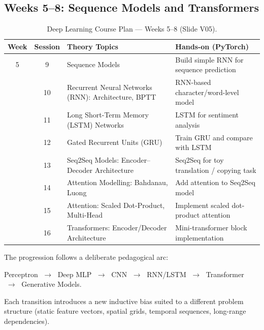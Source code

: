 \documentclass[12pt,a4paper]{article}
\begin{document}
\subsection{Weeks 5--8: Sequence Models and Transformers}
\label{subsec:weeks58}

\begin{table}[ht]
\centering
\caption{Deep Learning Course Plan — Weeks 5--8 (Slide V05).}
\label{tab:weeks58}
\begin{tabularx}{\textwidth}{cclX}
\toprule
\textbf{Week} & \textbf{Session} & \textbf{Theory Topics} & \textbf{Hands-on (PyTorch)} \\
\midrule
5  &  9 & Sequence Models
       & Build simple RNN for sequence prediction \\
\addlinespace
5  & 10 & Recurrent Neural Networks (RNN): Architecture, BPTT
       & RNN-based character/word-level model \\
\addlinespace
6  & 11 & Long Short-Term Memory (LSTM) Networks
       & LSTM for sentiment analysis \\
\addlinespace
6  & 12 & Gated Recurrent Units (GRU)
       & Train GRU and compare with LSTM \\
\addlinespace
7  & 13 & Seq2Seq Models: Encoder--Decoder Architecture
       & Seq2Seq for toy translation / copying task \\
\addlinespace
7  & 14 & Attention Modelling: Bahdanau, Luong
       & Add attention to Seq2Seq model \\
\addlinespace
8  & 15 & Attention: Scaled Dot-Product, Multi-Head
       & Implement scaled dot-product attention \\
\addlinespace
8  & 16 & Transformers: Encoder/Decoder Architecture
       & Mini-transformer block implementation \\
\bottomrule
\end{tabularx}
\end{table}

\begin{keyinsight}
The progression follows a deliberate pedagogical arc:
\begin{center}
Perceptron $\;\longrightarrow\;$ Deep MLP $\;\longrightarrow\;$ CNN
$\;\longrightarrow\;$ RNN/LSTM $\;\longrightarrow\;$ Transformer
$\;\longrightarrow\;$ Generative Models.
\end{center}
Each transition introduces a new inductive bias suited to a different
problem structure (static feature vectors, spatial grids, temporal sequences,
long-range dependencies).
\end{keyinsight}
\end{document}
